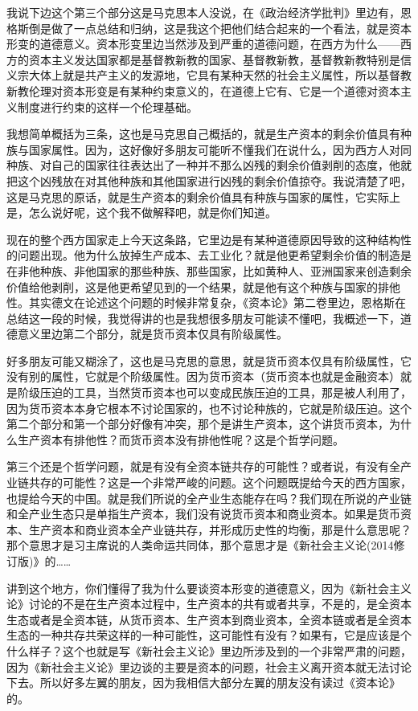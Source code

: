 \documentclass[UTF8, 12pt, a4paper]{ctexrep}
\begin{document}
我说下边这个第三个部分这是马克思本人没说，在《政治经济学批判》里边有，恩格斯倒是做了一点总结和归纳，这是我这个把他们结合起来的一个看法，就是资本形变的道德意义。资本形变里边当然涉及到严重的道德问题，在西方为什么——西方的资本主义发达国家都是基督教新教的国家、基督教新教，基督教新教特别是信义宗大体上就是共产主义的发源地，它具有某种天然的社会主义属性，所以基督教新教伦理对资本形变是有某种约束意义的，在道德上它有、它是一个道德对资本主义制度进行约束的这样一个伦理基础。

我想简单概括为三条，这也是马克思自己概括的，就是生产资本的剩余价值具有种族与国家属性。因为，这好像好多朋友可能听不懂我们在说什么，因为西方人对同种族、对自己的国家往往表达出了一种并不那么凶残的剩余价值剥削的态度，他就把这个凶残放在对其他种族和其他国家进行凶残的剩余价值掠夺。我说清楚了吧，这是马克思的原话，就是生产资本的剩余价值具有种族与国家的属性，它实际上是，怎么说好呢，这个我不做解释吧，就是你们知道。

现在的整个西方国家走上今天这条路，它里边是有某种道德原因导致的这种结构性的问题出现。他为什么放掉生产成本、去工业化？就是他更希望剩余价值的制造是在非他种族、非他国家的那些种族、那些国家，比如黄种人、亚洲国家来创造剩余价值给他剥削，这是他更希望见到的一个结果，就是他有这个种族与国家的排他性。其实德文在论述这个问题的时候非常复杂，《资本论》第二卷里边，恩格斯在总结这一段的时候，我觉得讲的也是我想很多朋友可能读不懂吧，我概述一下，道德意义里边第二个部分，就是货币资本仅具有阶级属性。

好多朋友可能又糊涂了，这也是马克思的意思，就是货币资本仅具有阶级属性，它没有别的属性，它就是个阶级属性。因为货币资本（货币资本也就是金融资本）就是阶级压迫的工具，当然货币资本也可以变成民族压迫的工具，那是被人利用了，因为货币资本本身它根本不讨论国家的，也不讨论种族的，它就是阶级压迫。这个第二个部分和第一个部分好像有冲突，那个是讲生产资本，这个讲货币资本，为什么生产资本有排他性？而货币资本没有排他性呢？这是个哲学问题。

第三个还是个哲学问题，就是有没有全资本链共存的可能性？或者说，有没有全产业链共存的可能性？这是一个非常严峻的问题。这个问题既提给今天的西方国家，也提给今天的中国。就是我们所说的全产业生态能存在吗？我们现在所说的产业链和全产业生态只是单指生产资本，我们没有说货币资本和商业资本。如果是货币资本、生产资本和商业资本全产业链共存，并形成历史性的均衡，那是什么意思呢？那个意思才是习主席说的人类命运共同体，那个意思才是《新社会主义论(2014修订版)》的……

讲到这个地方，你们懂得了我为什么要谈资本形变的道德意义，因为《新社会主义论》讨论的不是在生产资本过程中，生产资本的共有或者共享，不是的，是全资本生态或者是全资本链，从货币资本、生产资本到商业资本，全资本链或者是全资本生态的一种共存共荣这样的一种可能性，这可能性有没有？如果有，它是应该是个什么样子？这个也就是写《新社会主义论》里边所涉及到的一个非常严肃的问题，因为《新社会主义论》里边谈的主要是资本的问题，社会主义离开资本就无法讨论下去。所以好多左翼的朋友，因为我相信大部分左翼的朋友没有读过《资本论》的。
\end{document}
